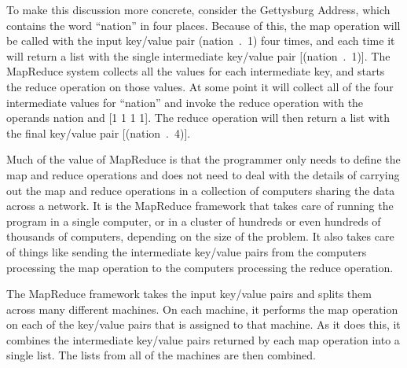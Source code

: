 To make this discussion more concrete, consider the Gettysburg Address,
which contains the word ``nation'' in four places. Because of this,
the map operation will be called with the input key/value pair \textsf{(nation~.~1)}
four times, and each time it will return a list with
the single intermediate key/value pair \textsf{[(nation~.~1)]}. The MapReduce
system collects all the values for each intermediate key, and starts the reduce
operation on those values.
At some point it will collect all of the four intermediate
values for ``nation'' and invoke the reduce operation with the operands
\textsf{nation} and \textsf{[1 1 1 1]}.
The reduce operation will then
return a list with the final key/value pair \textsf{[(nation~.~4)]}.


Much of the value of MapReduce is that the programmer only needs to
define the map and reduce operations and
does not need to deal with the details of carrying out the map and reduce
operations in a collection of computers sharing the data across a
network.  It is the MapReduce
framework that takes care of running the program in a single
computer, or in a cluster of hundreds or even hundreds of thousands
of computers, depending on the size of the problem.
It also takes care of things like
sending the intermediate key/value pairs
from the computers processing the map operation to the computers
processing the reduce operation.

The MapReduce framework
takes the input key/value pairs and splits them across many
different machines.  On each machine, it performs the map
operation on each of the key/value pairs that is assigned to
that machine.  As it does this, it combines the intermediate
key/value pairs returned by each map operation into a single
list.  The lists from all of the machines are then combined.

